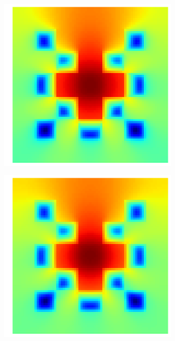 \begin{figure}[h]
\centering
\begin{subfigure}{0.49\columnwidth}
\includegraphics[width=\columnwidth]{images/checkerboard2d_p5_neumann_staggered_starmap.png}
\end{subfigure}%
\hspace{0.01\columnwidth}
\begin{subfigure}{0.49\columnwidth}
\includegraphics[width=\columnwidth]{images/checkerboard2d_p5_neumann_staggered.png}

\end{subfigure}
\end{figure}
